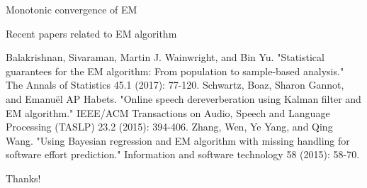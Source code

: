 \documentclass[12pt]{beamer}
\begin{document}
\begin{frame}{Monotonic convergence of EM}
\end{frame}

\begin{frame}{Recent papers related to EM algorithm}

\begin{thebibliography}{4}
 Balakrishnan, Sivaraman, Martin J. Wainwright, and Bin Yu. "Statistical guarantees for the EM algorithm: From population to sample-based analysis." The Annals of Statistics 45.1 (2017): 77-120.
 Schwartz, Boaz, Sharon Gannot, and Emanuël AP Habets. "Online speech dereverberation using Kalman filter and EM algorithm." IEEE/ACM Transactions on Audio, Speech and Language Processing (TASLP) 23.2 (2015): 394-406.
 Zhang, Wen, Ye Yang, and Qing Wang. "Using Bayesian regression and EM algorithm with missing handling for software effort prediction." Information and software technology 58 (2015): 58-70.
\end{thebibliography}
\end{frame}

{
\begin{frame}[standout]
\Huge{Thanks!}
\end{frame}
}
\end{document}
